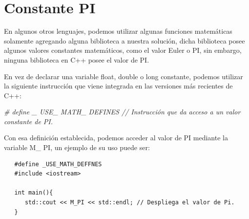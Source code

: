 \section{Constante PI}
\hspace{0.55cm}En algunos otros lenguajes, podemos utilizar algunas funciones matemáticas solamente agregando alguna biblioteca a nuestra solución, dicha biblioteca posee algunos valores constantes matemáticos, como el valor Euler o PI, sin embargo, ninguna biblioteca en C++ posee el valor de PI.

En vez de declarar una variable float, double o long constante, podemos utilizar la siguiente instrucción que viene integrada en las versiones más recientes de C++:
\begin{center}
	\textit{\# define \_ USE\_ MATH\_ DEFINES // Instrucción que da acceso a un valor constante de PI.}
\end{center}

Con esa definición establecida, podemos acceder al valor de PI mediante la variable M\_ PI, un ejemplo de su uso puede ser:
\begin{lstlisting}
   #define _USE_MATH_DEFFNES
   #include <iostream>

   int main(){
      std::cout << M_PI << std::endl; // Despliega el valor de Pi.
   }  
\end{lstlisting}